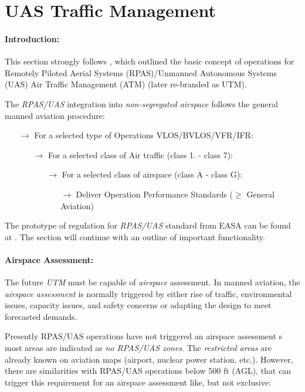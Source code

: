 \section{UAS Traffic Management}\label{sec:UTM}
\paragraph{Introduction:} This section strongly follows \cite{eurocontrol2018rpasatm}, which outlined the basic concept of operations for Remotely Piloted Aerial Systems (RPAS)/Unmanned Autonomous Systems (UAS) Air Traffic Management (ATM) (later re-branded as UTM).

The \emph{RPAS/UAS} integration into \emph{non-segregated airspace} follows the general manned aviation procedure:
\begin{itemize}
    \item[$\to$] For a selected type of Operations VLOS/BVLOS/VFR/IFR:
    \begin{itemize}
        \item[$\to$] For a selected class of Air traffic (class 1. - class 7):
        \begin{itemize}
            \item[$\to$] For a selected class of airspace (class A -  class G):
            \begin{itemize}
                \item[$\to$] Deliver Operation Performance Standards ($\ge$ General Aviation)
            \end{itemize}
        \end{itemize}
    \end{itemize}
\end{itemize}

\noindent  The prototype of regulation for \emph{RPAS/UAS} standard from EASA can be found at \cite{easa2016rpasroperegul}. The section will continue with an outline of important functionality.

\paragraph{Airspace Assessment:} The future \emph{UTM} must be capable of \emph{airspace} assessment. In manned aviation, the \emph{airspace assessment} is normally triggered by either rise of traffic, environmental issues, capacity issues, and safety concerns or adapting the design to meet forecasted demands.

Presently RPAS/UAS operations have not triggered an airspace assessment s most areas are indicated as \emph{no RPAS/UAS zones}. The \emph{restricted areas} are already known on aviation maps (airport, nuclear power station, etc.). However, there are similarities with RPAS/UAS operations below 500 ft (AGL), that can trigger this requirement for an airspace assessment like, but not exclusive:


